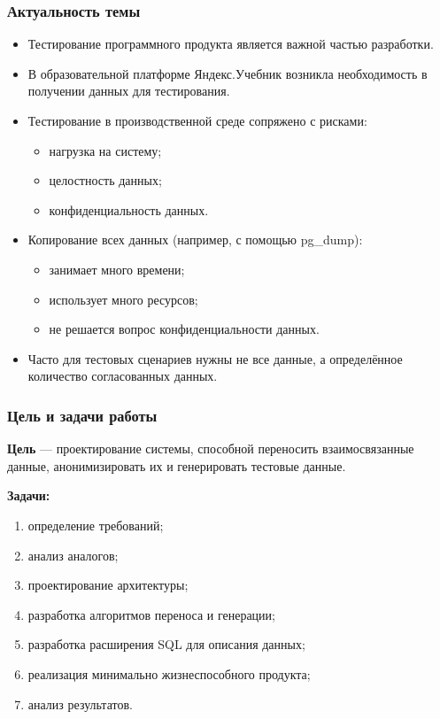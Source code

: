 \documentclass[pdf, hyperref={unicode}, aspectratio=169]{beamer}
\begin{document}

{
	\frame{\titlepage}
}

\begin{frame}
	\frametitle{Актуальность темы}
	\begin{itemize}
		\item Тестирование программного продукта является важной частью разработки.

		\item В образовательной платформе Яндекс.Учебник возникла необходимость в получении данных для тестирования.

		\item Тестирование в производственной среде сопряжено с рисками:
		\begin{itemize}
			\item нагрузка на систему;
			\item целостность данных;
			\item конфиденциальность данных.
		\end{itemize}

		\item Копирование всех данных (например, с помощью pg\_dump):
		\begin{itemize}
			\item занимает много времени;
			\item использует много ресурсов;
			\item не решается вопрос конфиденциальности данных.
		\end{itemize}

		\item Часто для тестовых сценариев нужны не все данные, а определённое количество согласованных данных.
	\end{itemize}
\end{frame}


\begin{frame}
	\frametitle{Цель и задачи работы}
	
	\textbf{Цель} --- проектирование системы, способной переносить взаимосвязанные данные, анонимизировать их и генерировать тестовые данные.

	\textbf{Задачи:}
	\begin{enumerate}
		\item определение требований;
		\item анализ аналогов;
		\item проектирование архитектуры;
		\item разработка алгоритмов переноса и генерации;
		\item разработка расширения SQL для описания данных;
		\item реализация минимально жизнеспособного продукта;
		\item анализ результатов.
	\end{enumerate}
\end{frame}
\end{document}
